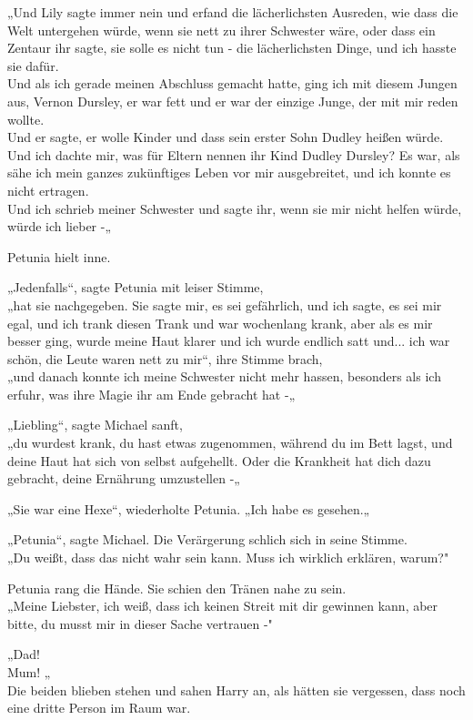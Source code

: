 {„Und Lily sagte immer nein und erfand die lächerlichsten Ausreden, wie dass die Welt untergehen würde, wenn sie nett zu ihrer Schwester wäre, oder dass ein Zentaur ihr sagte, sie solle es nicht tun - die lächerlichsten Dinge, und ich hasste sie dafür.\\ Und als ich gerade meinen Abschluss gemacht hatte, ging ich mit diesem Jungen aus, Vernon Dursley, er war fett und er war der einzige Junge, der mit mir reden wollte.\\ Und er sagte, er wolle Kinder und dass sein erster Sohn Dudley heißen würde. Und ich dachte mir, was für Eltern nennen ihr Kind Dudley Dursley? Es war, als sähe ich mein ganzes zukünftiges Leben vor mir ausgebreitet, und ich konnte es nicht ertragen.\\ Und ich schrieb meiner Schwester und sagte ihr, wenn sie mir nicht helfen würde, würde ich lieber -„

Petunia hielt inne.

„Jedenfalls“, sagte Petunia mit leiser Stimme,\\ „hat sie nachgegeben. Sie sagte mir, es sei gefährlich, und ich sagte, es sei mir egal, und ich trank diesen Trank und war wochenlang krank, aber als es mir besser ging, wurde meine Haut klarer und ich wurde endlich satt und... ich war schön, die Leute waren nett zu mir“, ihre Stimme brach,\\ „und danach konnte ich meine Schwester nicht mehr hassen, besonders als ich erfuhr, was ihre Magie ihr am Ende gebracht hat -„

„Liebling“, sagte Michael sanft,\\ „du wurdest krank, du hast etwas zugenommen, während du im Bett lagst, und deine Haut hat sich von selbst aufgehellt. Oder die Krankheit hat dich dazu gebracht, deine Ernährung umzustellen -„

„Sie war eine Hexe“, wiederholte Petunia. „Ich habe es gesehen.„

„Petunia“, sagte Michael. Die Verärgerung schlich sich in seine Stimme.\\ „Du weißt, dass das nicht wahr sein kann. Muss ich wirklich erklären, warum?"

Petunia rang die Hände. Sie schien den Tränen nahe zu sein.\\ „Meine Liebster, ich weiß, dass ich keinen Streit mit dir gewinnen kann, aber bitte, du musst mir in dieser Sache vertrauen -"

„Dad!\\ Mum! „\\ Die beiden blieben stehen und sahen Harry an, als hätten sie vergessen, dass noch eine dritte Person im Raum war.

}
